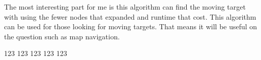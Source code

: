 \documentclass{article}
\begin{document}
The most interesting part for me is this algorithm can find the moving target with using the fewer nodes that expanded and runtime that cost.
This algorithm can be used for those looking for moving targets. 
That means it will be useful on the question such as map navigation.


123\cite{greenwade93}
123\cite{rahtz89}
123\cite{patashnik88}
123\cite{lamport94}
123\cite{M}




\end{document}

